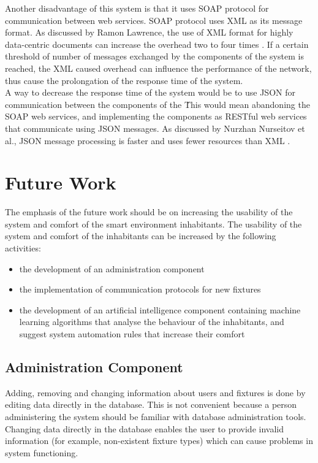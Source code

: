 	Another disadvantage of this system is that it uses SOAP protocol for communication between web services. SOAP protocol uses XML as its message format. As discussed by Ramon Lawrence, the use of XML format for highly data-centric documents can increase the overhead two to four times  \cite{XML}. If a certain threshold of number of messages exchanged by the components of the system is reached, the XML caused overhead can influence the performance of the network, thus cause the prolongation of the response time of the system. \\
 	A way to decrease the response time of the system would be to use JSON for communication between the components of the \seif\. This would mean abandoning the SOAP web services, and implementing the components as RESTful web services that communicate using JSON messages. As discussed by Nurzhan Nurseitov et al., JSON message processing is faster and uses fewer resources than XML \cite{xmlVSjson}.


\section{Future Work}

The emphasis of the future work should be on increasing the usability of the system and comfort of the smart environment inhabitants. The usability of the system and comfort of the inhabitants can be increased by the following activities:
\begin{itemize}
\item the development of an administration component
\item the implementation of communication protocols for new fixtures
\item the development of an artificial intelligence component containing machine learning algorithms that analyse the behaviour of the inhabitants, and suggest system automation rules that increase their comfort
\end{itemize}

\subsection{Administration Component}

Adding, removing and changing information about users and fixtures is done by editing data directly in the database. This is not convenient because a person administering the system should be familiar with database administration tools. Changing data directly in the database enables the user to provide invalid information (for example, non-existent fixture types) which can cause problems in system functioning. \\

